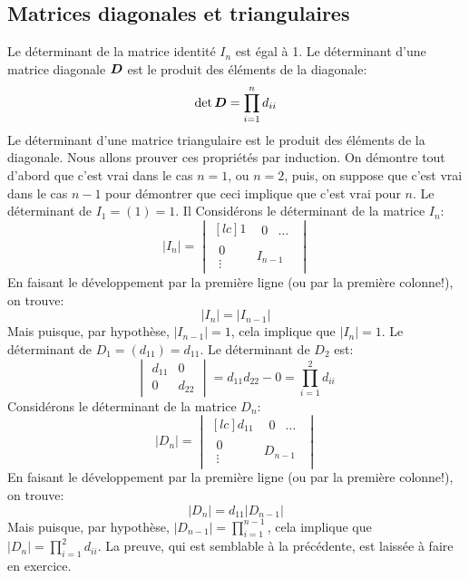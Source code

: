 \subsection{Matrices diagonales et triangulaires}
\begin{theo}
 Le déterminant de la matrice identité $I_n$ est égal à 1.
 Le déterminant d'une matrice diagonale $\boldsymbol{D}$ est le produit des
éléments de la diagonale: 
\[
\det \boldsymbol{D} = \prod_{i=1}^n d_{ii}
\]
 Le déterminant d'une matrice triangulaire est le produit des éléments
de la diagonale.
\proof
Nous allons prouver ces propriétés par induction. On démontre tout d'abord que c'est
vrai dans le cas $n=1$, ou $n=2$, puis, on suppose que c'est vrai dans le cas $n-1$ pour démontrer
que ceci implique que c'est vrai pour $n$.
 Le déterminant de $I_1 = (1) = 1$.  Il Considérons le déterminant de
la matrice $I_n$:
\[
|I_n| = \begin{vmatrix}[lc]
1 & \begin{matrix} 0 & \ldots \end{matrix}\\
\begin{matrix}
0 \\
\vdots
\end{matrix} & I_{n-1} 
\end{vmatrix}
\]
En faisant le développement par la première ligne (ou par la première colonne!), on trouve:
\[
|I_n| = |I_{n-1}|
\]
Mais puisque, par hypothèse, $|I_{n-1}|=1$, cela implique que $|I_n|=1$. \cqfd
{} Le déterminant de $D_1 = (d_{11}) = d_{11}$.  Le déterminant
de $D_2$ est:
\[
\begin{vmatrix}
d_{11} & 0 \\
0 & d_{22}
\end{vmatrix} = d_{11}d_{22} - 0 = \prod_{i=1}^2 d_{ii}
\]
Considérons le déterminant de la matrice $D_n$:
\[
|D_n| = \begin{vmatrix}[lc]
d_{11} & \begin{matrix} 0 & \ldots \end{matrix}\\
\begin{matrix}
0 \\
\vdots
\end{matrix} & D_{n-1} 
\end{vmatrix}
\]
En faisant le développement par la première ligne (ou par la première colonne!), on trouve:
\[
|D_n| = d_{11}|D_{n-1}|
\]
Mais puisque, par hypothèse, $\displaystyle |D_{n-1}|=\prod_{i=1}^{n-1}$, cela implique que 
$\displaystyle |D_n|=\prod_{i=1}^2 d_{ii}$. \cqfd
{} La preuve, qui est semblable à la précédente, est laissée à faire en exercice.
\end{theo}

